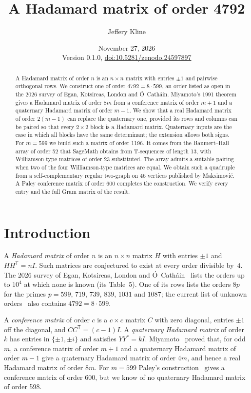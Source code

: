 \documentclass[10pt]{article}
\title{A Hadamard matrix of order 4792}
\author{Jeffery Kline}
\date{November 27, 2026\\[3pt]\small Version 0.1.0, \href{https://doi.org/10.5281/zenodo.24597897}{doi:10.5281/zenodo.24597897}}
\theoremstyle{definition}
\theoremstyle{remark}
\newcommand{\tr}{^{\mathsf T}}
\begin{document}
\maketitle

\begin{abstract}
A Hadamard matrix of order $n$ is an $n\times n$ matrix with entries $\pm1$ and pairwise orthogonal rows. We construct one of order $4792=8\cdot599$, an order listed as open in the 2026 survey of Egan, Kotsireas, London and \'O~Cath\'ain. Miyamoto's 1991 theorem gives a Hadamard matrix of order $8m$ from a conference matrix of order $m+1$ and a quaternary Hadamard matrix of order $m-1$. We show that a real Hadamard matrix of order $2(m-1)$ can replace the quaternary one, provided its rows and columns can be paired so that every $2\times2$ block is a Hadamard matrix. Quaternary inputs are the case in which all blocks have the same determinant; the extension allows both signs. For $m=599$ we build such a matrix of order 1196. It comes from the Baumert--Hall array of order 52 that SageMath obtains from T-sequences of length 13, with Williamson-type matrices of order 23 substituted. The array admits a suitable pairing when two of the four Williamson-type matrices are equal. We obtain such a quadruple from a self-complementary regular two-graph on 46 vertices published by Maksimovi\'c. A Paley conference matrix of order 600 completes the construction. We verify every entry and the full Gram matrix of the result.
\end{abstract}

\section{Introduction}\label{sec:intro}
A \emph{Hadamard matrix} of order $n$ is an $n\times n$ matrix $H$ with entries $\pm1$ and $HH\tr=nI$. Such matrices are conjectured to exist at every order divisible by~$4$. The 2026 survey of Egan, Kotsireas, London and \'O~Cath\'ain~\cite{EKLO} lists the orders up to $10^4$ at which none is known (its Table~5). One of its rows lists the orders $8p$ for the primes $p=599$, $719$, $739$, $839$, $1031$ and $1087$; the current list of unknown orders~\cite{U61} also contains $4792=8\cdot599$.

A \emph{conference matrix} of order $c$ is a $c\times c$ matrix $C$ with zero diagonal, entries $\pm1$ off the diagonal, and $CC\tr=(c-1)I$. A \emph{quaternary Hadamard matrix} of order $k$ has entries in $\{\pm1,\pm i\}$ and satisfies $YY^*=kI$. Miyamoto~\cite[Theorem~7]{Mi91} proved that, for odd $m$, a conference matrix of order $m+1$ and a quaternary Hadamard matrix of order $m-1$ give a quaternary Hadamard matrix of order $4m$, and hence a real Hadamard matrix of order $8m$. For $m=599$ Paley's construction~\cite{Pa33} gives a conference matrix of order 600, but we know of no quaternary Hadamard matrix of order 598.
\end{document}
